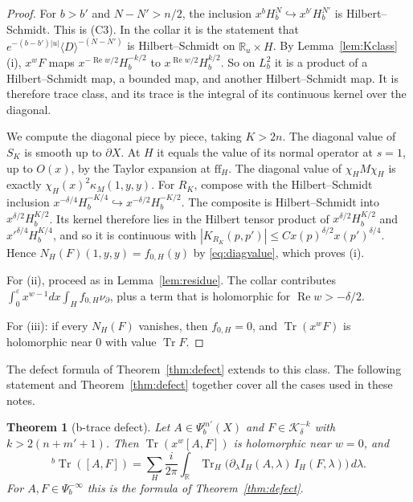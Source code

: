 \documentclass[11pt,oneside,reqno]{article}
\DeclareMathOperator{\Tr}{Tr}
\theoremstyle{plain}
\newtheorem{theorem}{Theorem}[section]
\theoremstyle{definition}
\theoremstyle{remark}
\begin{document}
\begin{proof}
For \(b>b'\) and \(N-N'>n/2\), the inclusion
\(x^{b}H^N_b\hookrightarrow x^{b'}H^{N'}_b\) is Hilbert--Schmidt. This is
(C3). In the collar it is the statement that
\(e^{-(b-b')|u|}\langle D\rangle^{-(N-N')}\) is Hilbert--Schmidt on
\(\mathbb R_u\times H\). By Lemma~\ref{lem:Kclass}(i), \(x^wF\) maps
\(x^{-\operatorname{Re}w/2}H^{-k/2}_b\) to \(x^{\operatorname{Re}w/2}H^{k/2}_b\).
So on \(L^2_b\) it is a product of a Hilbert--Schmidt map, a bounded map, and
another Hilbert--Schmidt map. It is therefore trace class, and its trace is
the integral of its continuous kernel over the diagonal.

We compute the diagonal piece by piece, taking \(K>2n\). The diagonal value
of \(S_K\) is smooth up to \(\partial X\). At \(H\) it equals the value of
its normal operator at \(s=1\), up to \(O(x)\), by the Taylor expansion at
\(\mathrm{ff}_H\). The diagonal value of \(\chi_HM\chi_H\) is exactly
\(\chi_H(x)^2\kappa_M(1,y,y)\). For \(R_K\), compose with the
Hilbert--Schmidt inclusion
\(x^{-\delta/4}H^{-K/4}_b\hookrightarrow x^{-\delta/2}H^{-K/2}_b\). The
composite is Hilbert--Schmidt into \(x^{\delta/2}H^{K/2}_b\). Its kernel
therefore lies in the Hilbert tensor product of
\(x^{\delta/2}H^{K/2}_b\) and \(x'^{\delta/4}H^{K/4}_b\), and so it is
continuous with \(|K_{R_K}(p,p')|\leq Cx(p)^{\delta/2}x(p')^{\delta/4}\).
Hence \(N_H(F)(1,y,y)=f_{0,H}(y)\) by \eqref{eq:diagvalue}, which proves (i).

For (ii), proceed as in Lemma~\ref{lem:residue}. The collar contributes
\(\int_0^\varepsilon x^{w-1}dx\int_Hf_{0,H}\nu_\partial\), plus a term that is
holomorphic for \(\operatorname{Re}w>-\delta/2\).

For (iii): if every \(N_H(F)\) vanishes, then \(f_{0,H}=0\), and
\(\Tr(x^wF)\) is holomorphic near \(0\) with value \(\Tr F\).
\end{proof}

The defect formula of Theorem~\ref{thm:defect} extends to this class. The
following statement and Theorem~\ref{thm:defect} together cover all the
cases used in these notes.

\begin{theorem}[b-trace defect]\label{thm:defectK}
Let \(A\in\Psi_b^{m'}(X)\) and \(F\in\mathcal K^{-k}_\delta\) with
\(k>2(n+m'+1)\). Then \(\Tr(x^w[A,F])\) is holomorphic near \(w=0\), and
\[
 {}^b\Tr([A,F])=\sum_H\frac{i}{2\pi}\int_{\mathbb R}
 \Tr_H\bigl(\partial_\lambda I_H(A,\lambda)\,I_H(F,\lambda)\bigr)\,d\lambda .
\]
For \(A,F\in\Psi_b^{-\infty}\) this is the formula of
Theorem~\ref{thm:defect}.
\end{theorem}
\end{document}
